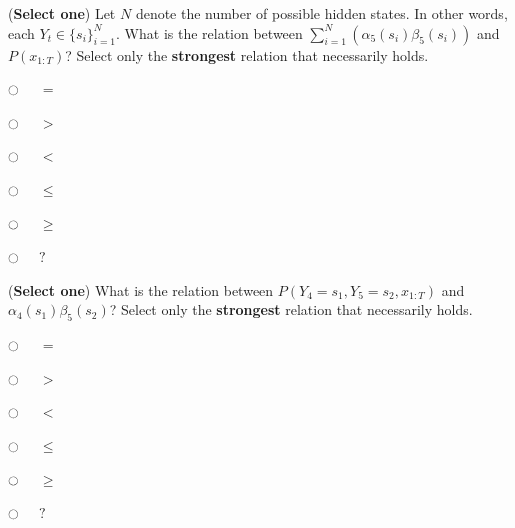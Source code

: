 \documentclass[11pt,addpoints,answers]{exam}
\newcommand{\emptycircle}{{\LARGE $\fullmoon$}\ \ }
\newcommand{\filledcircle}{{\LARGE $\newmoon$}\ \ }
\begin{document}
\begin{questions}
\begin{parts}
\begin{subparts}
\subpart[1] (\textbf{Select one}) Let $N$ denote the number of possible hidden states. In other words, each $Y_t \in \{s_i\}_{i=1}^{N}$. What is the relation between $\sum_{i=1}^{N}(\alpha_5(s_i)\beta_5(s_i))$ and $P(x_{1:T})$? Select only the \textbf{strongest} relation that necessarily holds.
\begin{list}{}
    \item 
        \emptycircle 
        $=$
    \item 
        \emptycircle 
        $>$
    \item 
        \emptycircle 
        $<$
    \item 
        \emptycircle 
        $\leq$
    \item 
        \emptycircle 
        $\geq$
    \item 
        \emptycircle 
        $?$ 
\end{list}



\subpart[1] (\textbf{Select one}) What is the relation between $P(Y_4=s_1, Y_5=s_2, x_{1:T})$ and $\alpha_4(s_1) \beta_5(s_2)$? Select only the \textbf{strongest} relation that necessarily holds.

\begin{list}{}
    \item 
        \emptycircle 
        $=$ 
    \item 
        \emptycircle 
        $>$ 
    \item 
        \emptycircle 
        $<$ 
    \item 
        \emptycircle 
        $\leq$ 
    \item 
        \emptycircle 
        $\geq$ 
    \item 
        \emptycircle 
        $?$ 
\end{list}



\end{subparts}
\end{parts}
\end{questions}
\end{document}
